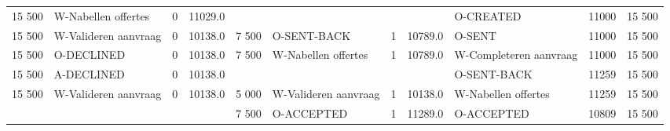 \begin{tabular}{lllllllllll}
15 500 & W-Nabellen offertes & 0 & 11029.0 &  &  &  &  & O-CREATED & 11000 & 15 500 \\
15 500 & W-Valideren aanvraag & 0 & 10138.0 & 7 500 & O-SENT-BACK & 1 & 10789.0 & O-SENT & 11000 & 15 500 \\
15 500 & O-DECLINED & 0 & 10138.0 & 7 500 & W-Nabellen offertes & 1 & 10789.0 & W-Completeren aanvraag & 11000 & 15 500 \\
15 500 & A-DECLINED & 0 & 10138.0 &  &  &  &  & O-SENT-BACK & 11259 & 15 500 \\
15 500 & W-Valideren aanvraag & 0 & 10138.0 & 5 000 & W-Valideren aanvraag & 1 & 10138.0 & W-Nabellen offertes & 11259 & 15 500 \\
 &  &  &  & 7 500 & O-ACCEPTED & 1 & 11289.0 & O-ACCEPTED & 10809 & 15 500 \\
\bottomrule
\end{tabular}
